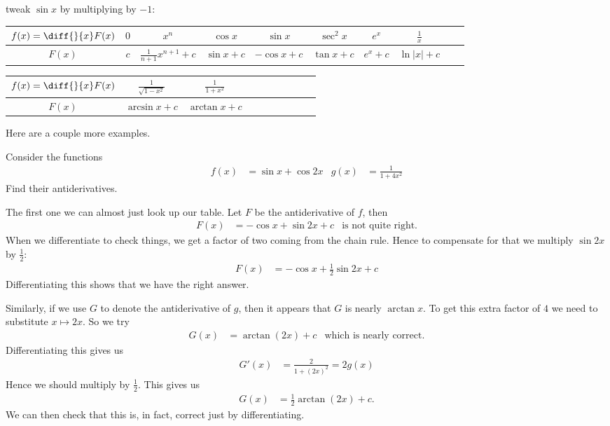 tweak $\sin x$ by multiplying by $-1$:
\renewcommand{\arraystretch}{1.3}
\begin{center}
     \begin{tabular}{|c||c|c|c|c|c|c|c|c|c|}
          \hline
                  $f(x)=\diff{}{x}F(x)$ & $0$ & $x^{n}$ & $\cos x$
                  & $\sin x$
                  &  $\sec^2 x$ & $e^x$ & $\frac{1}{x}$
           \\ \hline
                  $F(x)$ &   $c$ &  $\frac{1}{n+1}x^{n+1}+c$ & $\sin x+c$ &
$-\cos x+c$
                  & $\tan x+c$ & $e^x+c$ & $\ln |x|+c$
           \\ \hline
     \end{tabular}
\end{center}
\begin{center}
     \begin{tabular}{|c||c|c|c|c|c|c|c|c|c|}
          \hline
                  $f(x)=\diff{}{x}F(x)$
                  & $\frac{1}{\sqrt{1-x^2}}$ & $\frac{1}{1+x^2}$
           \\ \hline
                  $F(x)$
                  & $\arcsin x+c$ & $\arctan x+c$
           \\ \hline
     \end{tabular}
\end{center}
\renewcommand{\arraystretch}{1.0}

Here are a couple more examples.
\begin{eg}\label{eg_4_1_1}
Consider the functions
\begin{align*}
  f(x) &= \sin x + \cos 2x & g(x) &= \frac{1}{1+4x^2}
\end{align*}
Find their antiderivatives.

\soln
The first one we can almost just look up our table. Let $F$ be the
antiderivative of $f$, then
\begin{align*}
  F(x) &= -\cos x + \sin 2x + c & \text{is not quite right}.
\end{align*}
When we differentiate to check things, we get a factor of two coming from the
chain rule. Hence to compensate for that we multiply $\sin2x$ by $\frac{1}{2}$:
\begin{align*}
  F(x) &= -\cos x + \frac{1}{2} \sin 2x + c
\end{align*}
Differentiating this shows that we have the right answer.


Similarly, if we use $G$ to denote the antiderivative of $g$, then it appears
that $G$ is nearly $\arctan x$. To get this extra factor of $4$ we need to
substitute $x \mapsto 2x$. So we try
\begin{align*}
  G(x) &= \arctan(2x)+c  & \text{which is nearly correct}.
\end{align*}
Differentiating this gives us
\begin{align*}
  G'(x) &= \frac{2}{1+(2x)^2} = 2g(x)
\end{align*}
Hence we should multiply by $\frac{1}{2}$. This gives us
\begin{align*}
  G(x) &= \frac{1}{2} \arctan(2x) + c.
\end{align*}
We can then check that this is, in fact, correct just by differentiating.
\end{eg}


